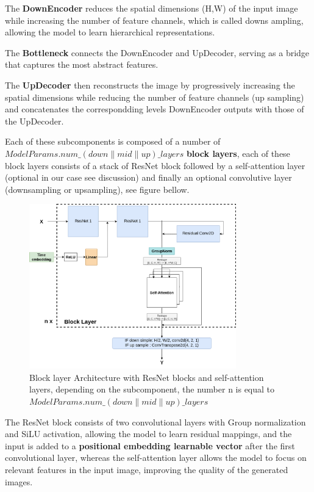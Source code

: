 \documentclass[twocolumn,superscriptaddress,aps]{revtex4-1}
\begin{document}
The \textbf{DownEncoder} reduces the spatial dimensions (H,W) of the input image while increasing the number of feature channels, which is called downs ampling, allowing the model to learn hierarchical representations.

The \textbf{Bottleneck} connects the DownEncoder and UpDecoder, serving as a bridge that captures the most abstract features.

The \textbf{UpDecoder} then reconstructs the image by progressively increasing the spatial dimensions while reducing the number of feature channels (up sampling) and concatenates the correspondding levels DownEncoder outputs with those of the UpDecoder.

Each of these subcomponents is composed of a number of \small{$ModelParams.num\_(down\|mid\|up)\_layers$} \textbf{block layers}, each of these block layers consists of a stack of ResNet block followed by a self-attention layer (optional in our case see discussion) and finally an optional convolutive layer (downsampling or upsampling), see figure bellow.

\begin{figure}[ht]
	\centering
	\includegraphics[width=0.8\textwidth]{figures/block_layer.png}
	\caption{Block layer Architecture with ResNet blocks and self-attention layers, depending on the subcomponent, the number n is equal to \small{$ModelParams.num\_(down\|mid\|up)\_layers$}}
	\label{fig:unet_architecture}
\end{figure}

The ResNet block consists of two convolutional layers with Group normalization and SiLU activation, allowing the model to learn residual mappings, and the input is added to a \textbf{positional embedding learnable vector} after the first convolutional layer, whereas the self-attention layer allows the model to focus on relevant features in the input image, improving the quality of the generated images.
\end{document}
